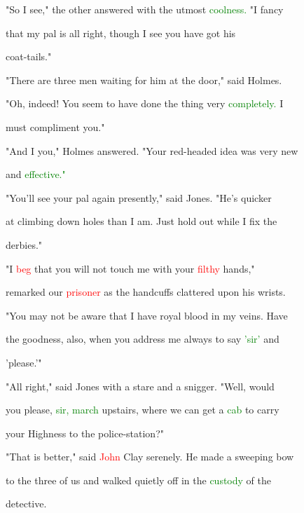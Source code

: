  "So I see," the other answered with the utmost \textcolor{green}{coolness.} "I \textcolor{BurntOrange}{fancy}

 that my pal is all right, though I see you have got his

 coat-tails."



 "There are three men \textcolor{BurntOrange}{waiting} for him at the door," said Holmes.



 "Oh, indeed! You seem to have done the thing very \textcolor{green}{completely.} I

 must \textcolor{BurntOrange}{compliment} you."



 "And I you," Holmes answered. "Your red-headed idea was very new

 and \textcolor{green}{effective."}



 "You'll see your pal again presently," said Jones. "He's quicker

 at climbing down holes than I am. Just hold out while I fix the

 derbies."



 "I \textcolor{red}{beg} that you will not touch me with your \textcolor{red}{filthy} hands,"

 remarked our \textcolor{red}{prisoner} as the handcuffs clattered upon his wrists.

 "You may not be aware that I have royal blood in my veins. Have

 the \textcolor{BurntOrange}{goodness,} also, when you address me always to say \textcolor{green}{'sir'} and

 'please.'"



 "All right," said Jones with a stare and a snigger. "Well, would

 you please, \textcolor{green}{sir,} \textcolor{green}{march} upstairs, where we can get a \textcolor{green}{cab} to carry

 your Highness to the police-station?"



 "That is better," said \textcolor{red}{John} Clay serenely. He made a sweeping bow

 to the three of us and walked quietly off in the \textcolor{green}{custody} of the

 detective.



